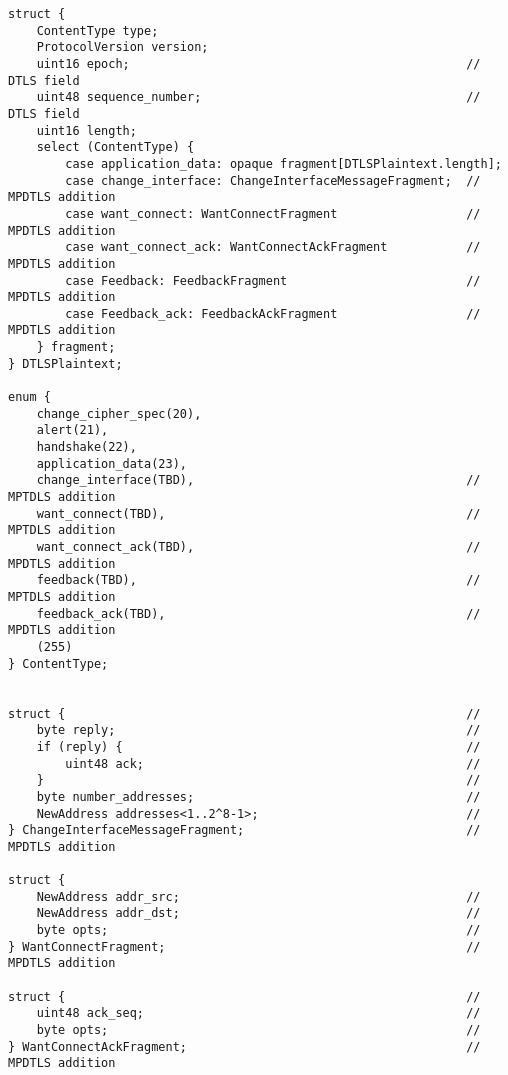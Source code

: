 \begin{lstlisting}
struct {
    ContentType type;
    ProtocolVersion version;
    uint16 epoch;                                               // DTLS field
    uint48 sequence_number;                                     // DTLS field
    uint16 length;
    select (ContentType) {
        case application_data: opaque fragment[DTLSPlaintext.length];
        case change_interface: ChangeInterfaceMessageFragment;  // MPDTLS addition
        case want_connect: WantConnectFragment                  // MPDTLS addition
        case want_connect_ack: WantConnectAckFragment           // MPDTLS addition
        case Feedback: FeedbackFragment                         // MPDTLS addition
        case Feedback_ack: FeedbackAckFragment                  // MPDTLS addition
    } fragment;
} DTLSPlaintext;

enum {
    change_cipher_spec(20),
    alert(21),
    handshake(22),
    application_data(23),
    change_interface(TBD),                                      // MPTDLS addition
    want_connect(TBD),                                          // MPTDLS addition
    want_connect_ack(TBD),                                      // MPDTLS addition
    feedback(TBD),                                              // MPTDLS addition
    feedback_ack(TBD),                                          // MPDTLS addition
    (255)
} ContentType;


struct {                                                        //
    byte reply;                                                 //
    if (reply) {                                                //
        uint48 ack;                                             //
    }                                                           //
    byte number_addresses;                                      //
    NewAddress addresses<1..2^8-1>;                             //
} ChangeInterfaceMessageFragment;                               // MPDTLS addition

struct {
    NewAddress addr_src;                                        //
    NewAddress addr_dst;                                        //
    byte opts;                                                  //
} WantConnectFragment;                                          // MPDTLS addition

struct {                                                        //
    uint48 ack_seq;                                             //
    byte opts;                                                  //
} WantConnectAckFragment;                                       // MPDTLS addition


\end{lstlisting}
